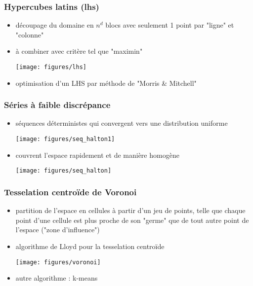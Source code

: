 \documentclass[10pt]{beamer}
\begin{document}
\begin{frame}
\frametitle{Hypercubes latins (lhs)}
\bigskip

\begin{itemize}
	\item découpage du domaine en $ n^{d} $ blocs avec seulement 1 point par "ligne" et "colonne"
	\item à combiner avec critère tel que "maximin"
	\begin{center}
		\texttt{[image: figures/lhs]}
	\end{center}
	\item optimisation d'un LHS par méthode de "Morris \& Mitchell"
\end{itemize}

\end{frame}

\begin{frame}
\frametitle{Séries à faible discrépance}
\bigskip

\begin{itemize}
	\item séquences déterministes qui convergent vers une distribution uniforme
	\begin{center}
		\texttt{[image: figures/seq\_halton1]}
	\end{center}
	\item couvrent l'espace rapidement et de manière homogène
	\begin{center}
		\texttt{[image: figures/seq\_halton]}
	\end{center}
\end{itemize}

\end{frame}

\begin{frame}
\frametitle{Tesselation centroïde de Voronoi}
\bigskip

\begin{itemize}
	\item partition de l'espace en cellules à partir d'un jeu de points, telle que chaque point d'une cellule est plus proche de son "germe" que de tout autre point de l'espace ("zone d'influence")
	\item algorithme de Lloyd pour la tesselation centroïde
	\begin{center}
		\texttt{[image: figures/voronoi]}
	\end{center}
	\item autre algorithme : k-means
\end{itemize}

\end{frame}
\end{document}
